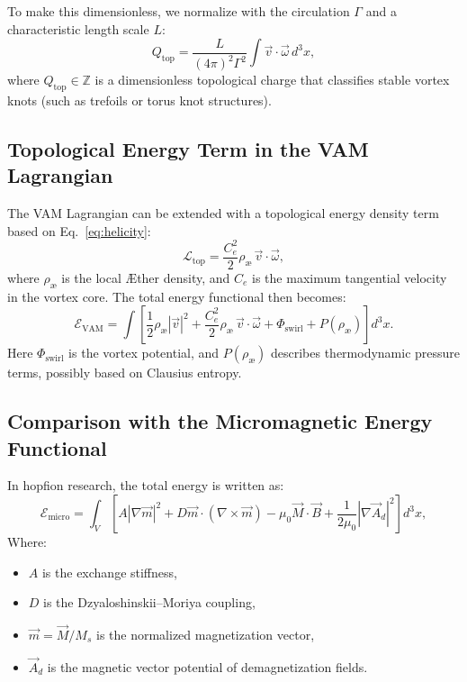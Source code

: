 \documentclass[preprint]{revtex4-2}
\begin{document}
To make this dimensionless, we normalize with the circulation $\Gamma$ and a characteristic length scale $L$:
\begin{equation}
    Q_\text{top} = \frac{L}{(4\pi)^2 \Gamma^2} \int \vec{v} \cdot \vec{\omega} \, d^3x,
    \label{eq:qtop}
\end{equation}
where $Q_\text{top} \in \mathbb{Z}$ is a dimensionless topological charge that classifies stable vortex knots (such as trefoils or torus knot structures).

\subsection{Topological Energy Term in the VAM Lagrangian}

The VAM Lagrangian can be extended with a topological energy density term based on Eq.~\eqref{eq:helicity}:
\begin{equation}
    \mathcal{L}_\text{top} = \frac{C_e^2}{2} \rho_\text{\ae} \, \vec{v} \cdot \vec{\omega},
\end{equation}
where $\rho_\text{\ae}$ is the local Æther density, and $C_e$ is the maximum tangential velocity in the vortex core. The total energy functional then becomes:
\begin{equation}
    \mathcal{E}_\text{VAM} = \int \left[
                                        \frac{1}{2} \rho_\text{\ae} |\vec{v}|^2
        + \frac{C_e^2}{2} \rho_\text{\ae} \, \vec{v} \cdot \vec{\omega}
                                        + \Phi_\text{swirl} + P(\rho_\text{\ae})
    \right] d^3x.
\end{equation}
Here $\Phi_\text{swirl}$ is the vortex potential, and $P(\rho_\text{\ae})$ describes thermodynamic pressure terms, possibly based on Clausius entropy.

\subsection{Comparison with the Micromagnetic Energy Functional}

In hopfion research, the total energy is written as:
\begin{equation}
    \mathcal{E}_\text{micro} = \int_V \left[
                                            A |\nabla \vec{m}|^2 + D \vec{m} \cdot (\nabla \times \vec{m}) - \mu_0 \vec{M} \cdot \vec{B} + \frac{1}{2\mu_0} |\nabla \vec{A}_d|^2
    \right] d^3x,
\end{equation}
Where:
\begin{itemize}
    \item $A$ is the exchange stiffness,
    \item $D$ is the Dzyaloshinskii–Moriya coupling,
    \item $\vec{m} = \vec{M}/M_s$ is the normalized magnetization vector,
    \item $\vec{A}_d$ is the magnetic vector potential of demagnetization fields.
\end{itemize}
\end{document}
